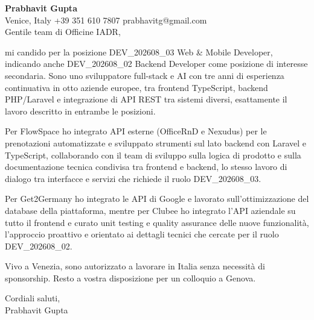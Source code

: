 \documentclass[a4paper,10.5pt]{article}
\begin{document}
\textbf{Prabhavit Gupta}\\
Venice, Italy \textbar{} +39 351 610 7807 \textbar{} prabhavitg@gmail.com\\[10pt]
Gentile team di Officine IADR,

mi candido per la posizione DEV\_202608\_03 Web \& Mobile Developer, indicando anche DEV\_202608\_02 Backend Developer come posizione di interesse secondaria. Sono uno sviluppatore full-stack e AI con tre anni di esperienza continuativa in otto aziende europee, tra frontend TypeScript, backend PHP/Laravel e integrazione di API REST tra sistemi diversi, esattamente il lavoro descritto in entrambe le posizioni.

Per FlowSpace ho integrato API esterne (OfficeRnD e Nexudus) per le prenotazioni automatizzate e sviluppato strumenti sul lato backend con Laravel e TypeScript, collaborando con il team di sviluppo sulla logica di prodotto e sulla documentazione tecnica condivisa tra frontend e backend, lo stesso lavoro di dialogo tra interfacce e servizi che richiede il ruolo DEV\_202608\_03.

Per Get2Germany ho integrato le API di Google e lavorato sull'ottimizzazione del database della piattaforma, mentre per Clubee ho integrato l'API aziendale su tutto il frontend e curato unit testing e quality assurance delle nuove funzionalità, l'approccio proattivo e orientato ai dettagli tecnici che cercate per il ruolo DEV\_202608\_02.

Vivo a Venezia, sono autorizzato a lavorare in Italia senza necessità di sponsorship. Resto a vostra disposizione per un colloquio a Genova.

Cordiali saluti,\\
Prabhavit Gupta
\end{document}
